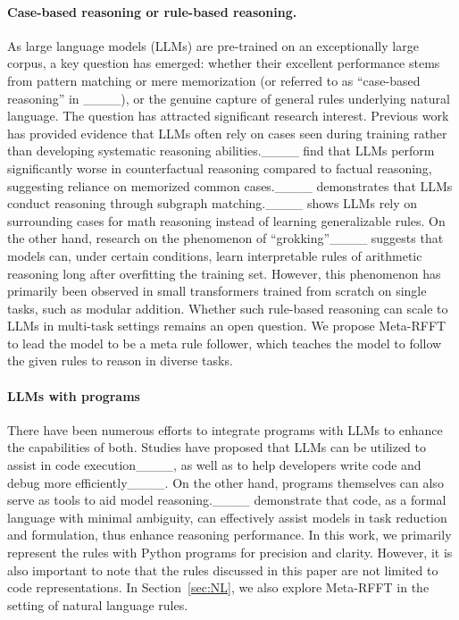 \paragraph{Case-based reasoning or rule-based reasoning.} 
As large language models (LLMs) are pre-trained on an exceptionally large corpus, a key question has emerged: whether their excellent performance stems from pattern matching or mere memorization (or referred to as ``case-based reasoning'' in ____), or the genuine capture of general rules underlying natural language. The question has attracted significant research interest. Previous work has provided evidence that LLMs often rely on cases seen during training rather than developing systematic reasoning abilities.____ find that LLMs perform significantly worse in counterfactual reasoning compared to factual reasoning, suggesting reliance on memorized common cases.____ demonstrates that LLMs conduct reasoning through subgraph matching.____ shows LLMs rely on surrounding cases for math reasoning instead of learning generalizable rules. 
On the other hand, research on the phenomenon of ``grokking''____ suggests that models can, under certain conditions, learn interpretable rules of arithmetic reasoning long after overfitting the training set. However, this phenomenon has primarily been observed in small transformers trained from scratch on single tasks, such as modular addition. Whether such rule-based reasoning can scale to LLMs in multi-task settings remains an open question. We propose Meta-RFFT to lead the model to be a meta rule follower, which teaches the model to follow the given rules to reason in diverse tasks.

\paragraph{LLMs with programs}
There have been numerous efforts to integrate programs with LLMs to enhance the capabilities of both. Studies have proposed that LLMs can be utilized to assist in code execution____, as well as to help developers write code and debug more efficiently____. On the other hand, programs themselves can also serve as tools to aid model reasoning.____ demonstrate that code, as a formal language with minimal ambiguity, can effectively assist models in task reduction and formulation, thus enhance reasoning performance.
In this work, we primarily represent the rules with Python programs for precision and clarity. However, it is also important to note that the rules discussed in this paper are not limited to code representations. In Section~\ref{sec:NL}, we also explore Meta-RFFT in the setting of natural language rules. 

